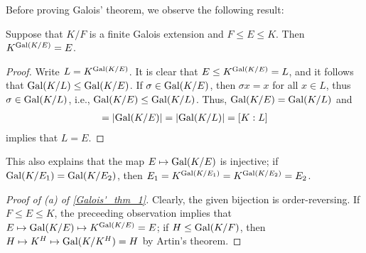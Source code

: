 Before proving Galois' theorem, we observe the following result:
\begin{obs}
    Suppose that $K/F$ is a finite Galois extension and $F\leq E\leq K$.
    Then $K^{{\textrm{Gal}({K/E})}}=E$.
\end{obs}
\begin{proof}
    Write $L=K^{\textrm{Gal}({K/E})}$.
    It is clear that $E\leq K^{\textrm{Gal}({K/E})}=L$, and it follows that ${\textrm{Gal}({K/L})}\leq{\textrm{Gal}({K/E})}$.
    If $\sigma\in{\textrm{Gal}({K/E})}$, then $\sigma x=x$ for all $x\in L$, thus $\sigma\in{\textrm{Gal}({K/L})}$, i.e., ${\textrm{Gal}({K/E})}\leq{\textrm{Gal}({K/L})}$.
    Thus, ${\textrm{Gal}({K/E})}={\textrm{Gal}({K/L})}$ and
    \begin{align*}
        [K:E]=|\gal{K/E}|=|\gal{K/L}|=[K:L]
    \end{align*}
    implies that $L=E$.
\end{proof}
\begin{rmk}
    This also explains that the map $E\mapsto{\textrm{Gal}({K/E})}$ is injective; if ${\textrm{Gal}({K/E_1})}={\textrm{Gal}({K/E_2})}$, then $E_1=K^{{\textrm{Gal}({K/E_1})}}=K^{{\textrm{Gal}({K/E_2})}}=E_2$.
\end{rmk}
\begin{proof}[Proof of (a) of \cref{Galois'_thm_1}]
    Clearly, the given bijection is order-reversing.
    If $F\leq E\leq K$, the preceeding observation implies that $E\mapsto{\textrm{Gal}({K/E})}\mapsto K^{\textrm{Gal}({K/E})}=E$; if $H\leq{\textrm{Gal}({K/F})}$, then $H\mapsto K^H\mapsto{\textrm{Gal}({K/K^H})}=H$ by Artin's theorem.
\end{proof}

